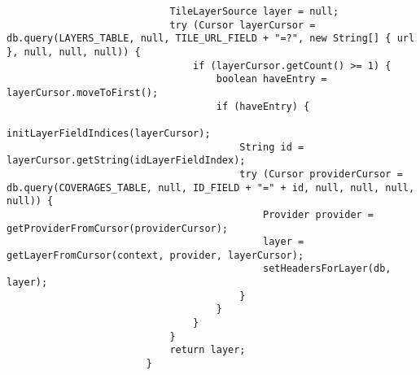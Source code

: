 \begin{enumerate}
\begin{itemize}
\begin{verbatim}
                            TileLayerSource layer = null;
                            try (Cursor layerCursor = db.query(LAYERS_TABLE, null, TILE_URL_FIELD + "=?", new String[] { url }, null, null, null)) {
                                if (layerCursor.getCount() >= 1) {
                                    boolean haveEntry = layerCursor.moveToFirst();
                                    if (haveEntry) {
                                        initLayerFieldIndices(layerCursor);
                                        String id = layerCursor.getString(idLayerFieldIndex);
                                        try (Cursor providerCursor = db.query(COVERAGES_TABLE, null, ID_FIELD + "=" + id, null, null, null, null)) {
                                            Provider provider = getProviderFromCursor(providerCursor);
                                            layer = getLayerFromCursor(context, provider, layerCursor);
                                            setHeadersForLayer(db, layer);
                                        }
                                    }
                                }
                            }
                            return layer;
                        }
                    \end{verbatim}
          \end{itemize}


\end{enumerate}
